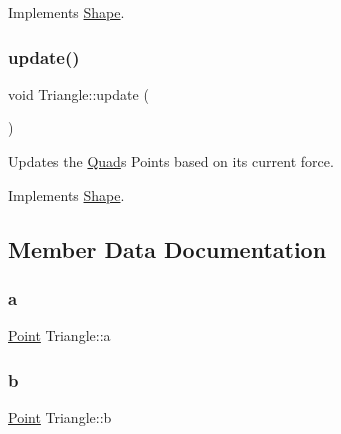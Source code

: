 Implements \mbox{\hyperlink{class_shape_a540779eb247ef00e4fb262f1f81e90d4}{Shape}}.

\mbox{\label{class_triangle_a7fbd07ca45c992b433e193f442993e54}} 
\subsubsection{\texorpdfstring{update()}{update()}}
{\footnotesize\ttfamily void Triangle\+::update (\begin{DoxyParamCaption}{ }\end{DoxyParamCaption})\hspace{0.3cm}{\ttfamily [virtual]}}



Updates the \mbox{\hyperlink{class_quad}{Quad}}\textquotesingle{}s Points based on its current force. 



Implements \mbox{\hyperlink{class_shape_a303c47b13b9339dc021e040bbba72651}{Shape}}.



\subsection{Member Data Documentation}
\mbox{\label{class_triangle_a08d2940a819cebd3321beeebbaef389e}} 
\subsubsection{\texorpdfstring{a}{a}}
{\footnotesize\ttfamily \mbox{\hyperlink{class_point}{Point}} Triangle\+::a}

\mbox{\label{class_triangle_af4167c2fce79260b261531d0b0fd3798}} 
\subsubsection{\texorpdfstring{b}{b}}
{\footnotesize\ttfamily \mbox{\hyperlink{class_point}{Point}} Triangle\+::b}

\mbox{\label{class_triangle_a71ce28afaa44e5b6c94a5150db358879}} 
